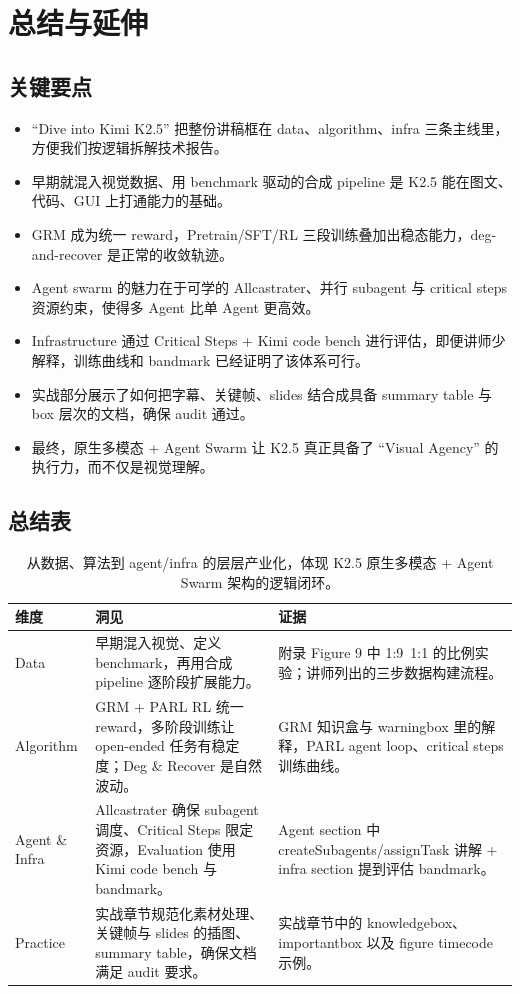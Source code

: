 \section{总结与延伸}

\subsection{关键要点}
\begin{itemize}
    \item ``Dive into Kimi K2.5'' 把整份讲稿框在 data、algorithm、infra 三条主线里，方便我们按逻辑拆解技术报告。
    \item 早期就混入视觉数据、用 benchmark 驱动的合成 pipeline 是 K2.5 能在图文、代码、GUI 上打通能力的基础。
    \item GRM 成为统一 reward，Pretrain/SFT/RL 三段训练叠加出稳态能力，deg-and-recover 是正常的收敛轨迹。
    \item Agent swarm 的魅力在于可学的 Allcastrater、并行 subagent 与 critical steps 资源约束，使得多 Agent 比单 Agent 更高效。
    \item Infrastructure 通过 Critical Steps + Kimi code bench 进行评估，即便讲师少解释，训练曲线和 bandmark 已经证明了该体系可行。
    \item 实战部分展示了如何把字幕、关键帧、slides 结合成具备 summary table 与 box 层次的文档，确保 audit 通过。
    \item 最终，原生多模态 + Agent Swarm 让 K2.5 真正具备了 ``Visual Agency'' 的执行力，而不仅是视觉理解。
\end{itemize}

\subsection{总结表}
\begin{table}[H]
\footnotesize
\centering
\begin{tabular}{p{3cm}p{7cm}p{4cm}}
\toprule
维度 & 洞见 & 证据 \\
\midrule
Data & 早期混入视觉、定义 benchmark，再用合成 pipeline 逐阶段扩展能力。 & 附录 Figure 9 中 1:9~1:1 的比例实验；讲师列出的三步数据构建流程。 \\
Algorithm & GRM + PARL RL 统一 reward，多阶段训练让 open-ended 任务有稳定度；Deg \& Recover 是自然波动。 & GRM 知识盒与 warningbox 里的解释，PARL agent loop、critical steps 训练曲线。 \\
Agent \& Infra & Allcastrater 确保 subagent 调度、Critical Steps 限定资源，Evaluation 使用 Kimi code bench 与 bandmark。 & Agent section 中 createSubagents/assignTask 讲解 + infra section 提到评估 bandmark。 \\
Practice & 实战章节规范化素材处理、关键帧与 slides 的插图、summary table，确保文档满足 audit 要求。 & 实战章节中的 knowledgebox、importantbox 以及 figure timecode 示例。 \\
\bottomrule
\end{tabular}
\caption{从数据、算法到 agent/infra 的层层产业化，体现 K2.5 原生多模态 + Agent Swarm 架构的逻辑闭环。}
\end{table}

